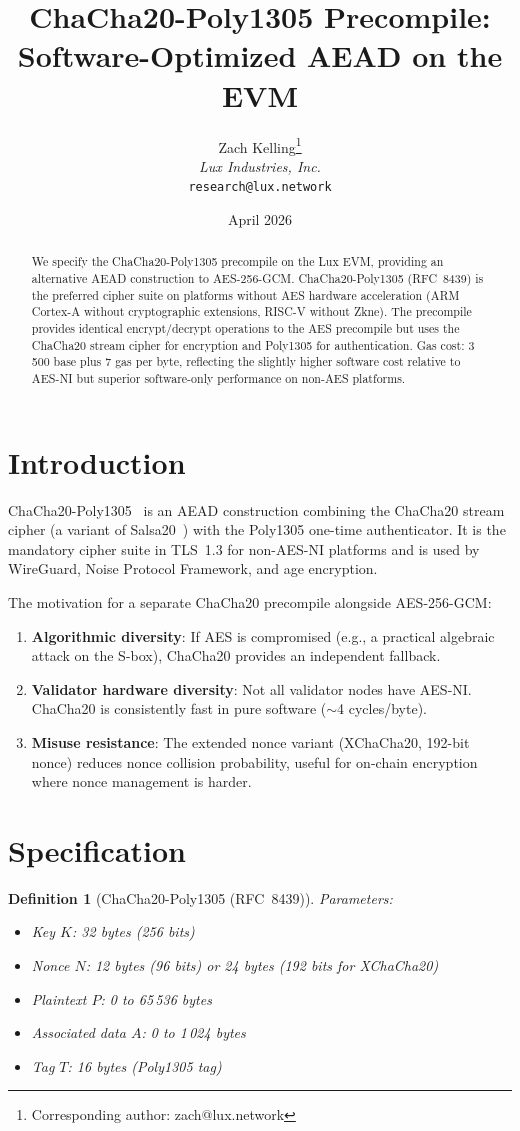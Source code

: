 \documentclass[11pt,a4paper]{article}
\title{ChaCha20-Poly1305 Precompile:\\Software-Optimized AEAD on the EVM}
\author{
Zach Kelling\thanks{Corresponding author: zach@lux.network}\\
\textit{Lux Industries, Inc.}\\
\texttt{research@lux.network}
}
\date{April 2026}
\newtheorem{definition}{Definition}
\begin{document}
\luxcoverpage

\begin{abstract}
We specify the ChaCha20-Poly1305 precompile on the Lux EVM, providing an
alternative AEAD construction to AES-256-GCM. ChaCha20-Poly1305 (RFC~8439) is
the preferred cipher suite on platforms without AES hardware acceleration
(ARM Cortex-A without cryptographic extensions, RISC-V without Zkne). The
precompile provides identical encrypt/decrypt operations to the AES precompile but
uses the ChaCha20 stream cipher for encryption and Poly1305 for authentication.
Gas cost: 3\,500 base plus 7 gas per byte, reflecting the slightly higher software
cost relative to AES-NI but superior software-only performance on non-AES platforms.
\end{abstract}

\section{Introduction}

ChaCha20-Poly1305~\cite{rfc8439} is an AEAD construction combining the ChaCha20
stream cipher (a variant of Salsa20~\cite{bernstein-chacha}) with the Poly1305
one-time authenticator. It is the mandatory cipher suite in TLS~1.3 for
non-AES-NI platforms and is used by WireGuard, Noise Protocol Framework,
and age encryption.

The motivation for a separate ChaCha20 precompile alongside AES-256-GCM:
\begin{enumerate}[label=(\roman*)]
  \item \textbf{Algorithmic diversity}: If AES is compromised (e.g., a practical
    algebraic attack on the S-box), ChaCha20 provides an independent fallback.
  \item \textbf{Validator hardware diversity}: Not all validator nodes have AES-NI.
    ChaCha20 is consistently fast in pure software ($\sim$4 cycles/byte).
  \item \textbf{Misuse resistance}: The extended nonce variant (XChaCha20, 192-bit
    nonce) reduces nonce collision probability, useful for on-chain encryption
    where nonce management is harder.
\end{enumerate}

\section{Specification}

\begin{definition}[ChaCha20-Poly1305 (RFC~8439)]
Parameters:
\begin{itemize}
  \item Key $K$: 32 bytes (256 bits)
  \item Nonce $N$: 12 bytes (96 bits) or 24 bytes (192 bits for XChaCha20)
  \item Plaintext $P$: 0 to 65\,536 bytes
  \item Associated data $A$: 0 to 1\,024 bytes
  \item Tag $T$: 16 bytes (Poly1305 tag)
\end{itemize}
\end{definition}
\end{document}
